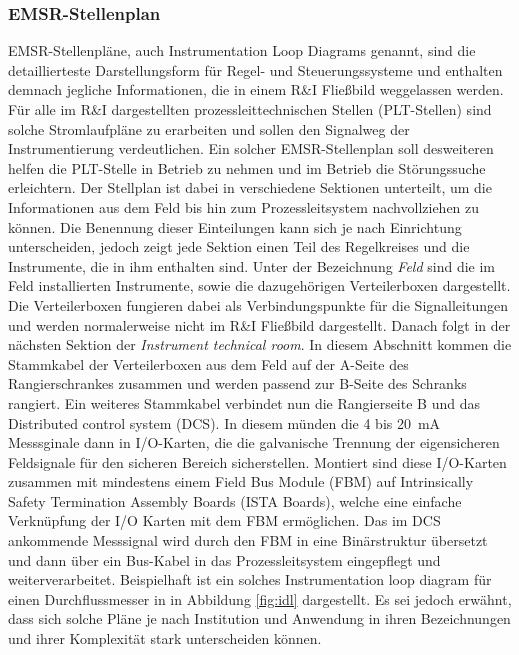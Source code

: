 \subsubsection{EMSR-Stellenplan}
EMSR-Stellenpläne, auch Instrumentation Loop Diagrams genannt, sind die detaillierteste Darstellungsform für Regel- und Steuerungssysteme und enthalten demnach jegliche Informationen, die in einem R\&I Fließbild weggelassen werden. Für alle im R\&I dargestellten prozessleittechnischen Stellen (PLT-Stellen) sind solche Stromlaufpläne zu erarbeiten und sollen den Signalweg der Instrumentierung verdeutlichen. Ein solcher EMSR-Stellenplan soll desweiteren helfen die PLT-Stelle in Betrieb zu nehmen und im Betrieb die Störungssuche erleichtern. \linebreak
Der Stellplan ist dabei in verschiedene Sektionen unterteilt, um die Informationen aus dem Feld bis hin zum Prozessleitsystem nachvollziehen zu können. Die Benennung dieser Einteilungen kann sich je nach Einrichtung unterscheiden, jedoch zeigt jede Sektion einen Teil des Regelkreises und die Instrumente, die in ihm enthalten sind.\linebreak
Unter der Bezeichnung \textit{Feld} sind die im Feld installierten Instrumente, sowie die dazugehörigen Verteilerboxen dargestellt. Die Verteilerboxen fungieren dabei als Verbindungspunkte für die Signalleitungen und werden normalerweise nicht im R\&I Fließbild dargestellt. Danach folgt in der nächsten Sektion der \textit{Instrument technical room}. In diesem Abschnitt kommen die Stammkabel der Verteilerboxen aus dem Feld auf der A-Seite des Rangierschrankes zusammen und werden passend zur B-Seite des Schranks rangiert. Ein weiteres Stammkabel verbindet nun die Rangierseite B und das Distributed control system (DCS). In diesem münden die 4 bis \SI{20}{\milli \ampere} Messsginale dann in I/O-Karten, die die galvanische Trennung der eigensicheren Feldsignale für den sicheren Bereich sicherstellen. Montiert sind diese I/O-Karten zusammen mit mindestens einem Field Bus Module (FBM) auf Intrinsically Safety Termination Assembly Boards (ISTA Boards), welche eine einfache Verknüpfung der I/O Karten mit dem FBM ermöglichen. Das im DCS ankommende Messsignal wird durch den FBM in eine Binärstruktur übersetzt und dann über ein Bus-Kabel in das Prozessleitsystem eingepflegt und weiterverarbeitet. Beispielhaft ist ein solches Instrumentation loop diagram für einen Durchflussmesser in in Abbildung \ref{fig:idl} dargestellt. Es sei jedoch erwähnt, dass sich solche Pläne je nach Institution und Anwendung in ihren Bezeichnungen und ihrer Komplexität stark unterscheiden können.

